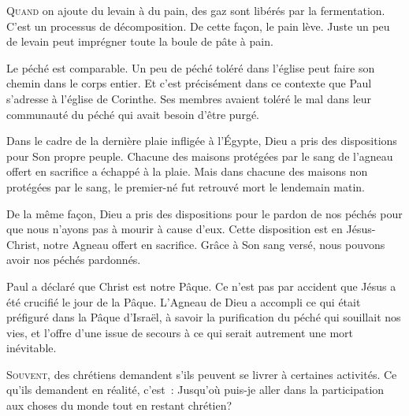 \lettrine{Q}{uand} on ajoute du levain à du pain,
 des gaz sont libérés par la fermentation.
 C'est un processus de décomposition.
 De cette façon, le pain lève.
 Juste un peu de levain peut imprégner
 toute la boule de pâte à pain.

Le péché est comparable.
 Un peu de péché toléré dans l'église
 peut faire son chemin dans le corps entier.
 Et c'est précisément dans ce contexte que Paul
 s'adresse à l'église de Corinthe.
 Ses membres avaient toléré le mal
 dans leur communauté
 \ocadr du péché qui avait besoin d'être purgé.


Dans le cadre de la dernière plaie infligée à l'Égypte,
 Dieu a pris des dispositions pour Son propre peuple.
 Chacune des maisons protégées par le sang de l'agneau
 offert en sacrifice a échappé à la plaie.
 Mais dans chacune des maisons non protégées par le sang,
 le premier-né fut retrouvé mort le lendemain matin.

De la même façon, Dieu a pris des dispositions
 pour le pardon de nos péchés pour que nous n'ayons pas
 à mourir à cause d'eux.
 Cette disposition est en Jésus-Christ,
 notre Agneau offert en sacrifice.
 Grâce à Son sang versé,
 nous pouvons avoir nos péchés pardonnés.

Paul a déclaré que \og Christ est notre Pâque. \fg{}
 Ce n'est pas par accident que Jésus a été crucifié le jour de la Pâque.
 L'Agneau de Dieu a accompli ce qui était préfiguré
 dans la Pâque d'Israël, à savoir la purification du péché
 qui souillait nos vies, et l'offre d'une issue de secours
 à ce qui serait autrement une mort inévitable.

\dvrule







\lettrine{S}{ouvent}, 
 des chrétiens demandent s'ils peuvent se livrer
 à certaines activités. Ce qu'ils demandent en réalité,
 c'est~:
 \og Jusqu'où puis-je aller dans la participation
 aux choses du monde tout en restant chrétien? \fg{}


